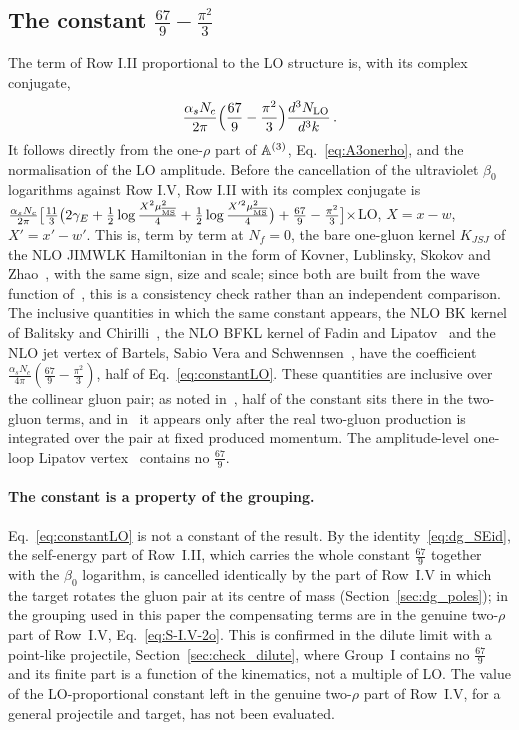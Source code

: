 \subsection{The constant \texorpdfstring{$\frac{67}{9}-\frac{\pi^2}{3}$}{67/9-pi2/3}}\label{sec:lit_constant}

The term of Row I.II proportional to the LO structure is, with its complex conjugate,
\begin{align}\label{eq:constantLO}
\frac{\alpha_sN_c}{2\pi}\Big(\frac{67}{9}-\frac{\pi^2}{3}\Big)\frac{d^3N_{\rm LO}}{d^3k}\,.
\end{align}
It follows directly from the one-$\rho$ part of $\mathbb{A}^{(3)}$, Eq.~\eqref{eq:A3onerho}, and the normalisation of the LO amplitude. Before the cancellation of the ultraviolet $\beta_0$ logarithms against Row I.V, Row I.II with its complex conjugate is $\frac{\alpha_sN_c}{2\pi}\big[\frac{11}{3}\big(2\gamma_E+\frac12\log\frac{X^2\mu^2_{\overline{\rm MS}}}{4}+\frac12\log\frac{X'^2\mu^2_{\overline{\rm MS}}}{4}\big)+\frac{67}{9}-\frac{\pi^2}{3}\big]\times$LO, $X=x-w$, $X'=x'-w'$. This is, term by term at $N_f=0$, the bare one-gluon kernel $K_{JSJ}$ of the NLO JIMWLK Hamiltonian in the form of Kovner, Lublinsky, Skokov and Zhao~\cite{Kovner:2023vsy}, with the same sign, size and scale; since both are built from the wave function of~\cite{Lublinsky:2016meo}, this is a consistency check rather than an independent comparison. The inclusive quantities in which the same constant appears, the NLO BK kernel of Balitsky and Chirilli~\cite{Balitsky:2007feb}, the NLO BFKL kernel of Fadin and Lipatov~\cite{Fadin:1998py} and the NLO jet vertex of Bartels, Sabio Vera and Schwennsen~\cite{Bartels:2006hg}, have the coefficient $\frac{\alpha_sN_c}{4\pi}(\frac{67}{9}-\frac{\pi^2}{3})$, half of Eq.~\eqref{eq:constantLO}. These quantities are inclusive over the collinear gluon pair; as noted in~\cite{Kovner:2023vsy}, half of the constant sits there in the two-gluon terms, and in~\cite{Fadin:1998py} it appears only after the real two-gluon production is integrated over the pair at fixed produced momentum. The amplitude-level one-loop Lipatov vertex~\cite{DelDuca:1998cx} contains no $\frac{67}{9}$.

\paragraph{The constant is a property of the grouping.} Eq.~\eqref{eq:constantLO} is not a constant of the result. By the identity~\eqref{eq:dg_SEid}, the self-energy part of Row~I.II, which carries the whole constant $\frac{67}{9}$ together with the $\beta_0$ logarithm, is cancelled identically by the part of Row~I.V in which the target rotates the gluon pair at its centre of mass (Section~\ref{sec:dg_poles}); in the grouping used in this paper the compensating terms are in the genuine two-$\rho$ part of Row~I.V, Eq.~\eqref{eq:S-I.V-2o}. This is confirmed in the dilute limit with a point-like projectile, Section~\ref{sec:check_dilute}, where Group~I contains no $\frac{67}{9}$ and its finite part is a function of the kinematics, not a multiple of LO. The value of the LO-proportional constant left in the genuine two-$\rho$ part of Row~I.V, for a general projectile and target, has not been evaluated.

